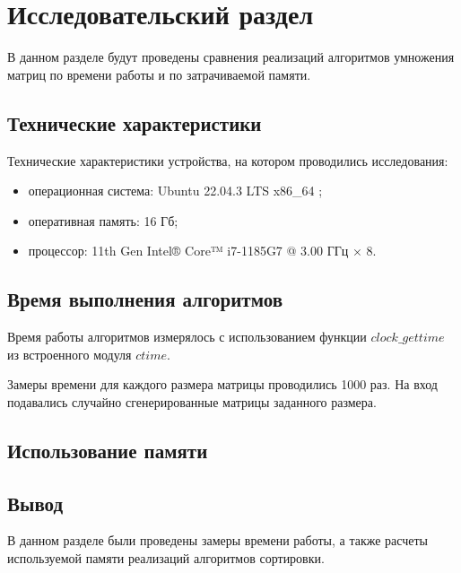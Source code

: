 \chapter{Исследовательский раздел}

В данном разделе будут проведены сравнения реализаций алгоритмов умножения матриц  по времени работы и по затрачиваемой памяти.

\section{Технические характеристики}

Технические характеристики устройства, на котором проводились исследования: 

\begin{itemize}[label=--]
	\item операционная система: Ubuntu 22.04.3 LTS x86\_64 \cite{os};
	\item оперативная память: 16 Гб;
	\item процессор: 11th Gen Intel® Core™ i7-1185G7 @ 3.00 ГГц × 8.
\end{itemize}

\section{Время выполнения алгоритмов}

Время работы алгоритмов измерялось с использованием функции $clock\_gettime$ из встроенного модуля $ctime$. 

Замеры времени для каждого размера матрицы проводились 1000 раз. На вход подавались случайно сгенерированные матрицы заданного размера.

\section{Использование памяти}


\section*{Вывод}

В данном разделе были проведены замеры времени работы, а также расчеты используемой памяти реализаций алгоритмов сортировки. 

